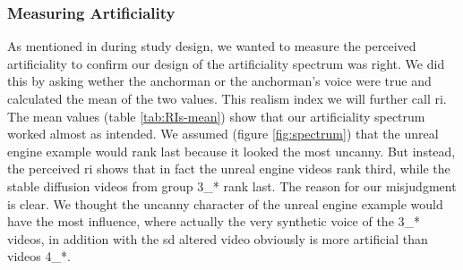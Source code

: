 \documentclass[
  a4paper,  %
  twoside,  %
  bibliography=totoc,
  headsepline,
  cleardoublepage=empty,
  parskip=half,
  draft=false
]{scrbook}
\begin{document}
\subsubsection{Measuring Artificiality}

As mentioned in during study design, we wanted to measure the perceived artificiality to confirm our design of the artificiality spectrum was right. We did this by asking wether the anchorman or the anchorman's voice were true and calculated the mean of the two values. This realism index we will further call \gls{ri}. \\
The mean values (table \ref{tab:RIs-mean}) show that our artificiality spectrum worked almost as intended. We assumed (figure \ref{fig:spectrum}) that the unreal engine example would rank last because it looked the most uncanny. But instead, the perceived \gls{ri} shows that in fact the unreal engine videos rank third, while the stable diffusion videos from group 3\_* rank last. The reason for our misjudgment is clear. We thought the uncanny character of the unreal engine example would have the most influence, where actually the very synthetic voice of the 3\_* videos, in addition with the \gls{sd} altered video obviously is more artificial than videos 4\_*. 
\end{document}
